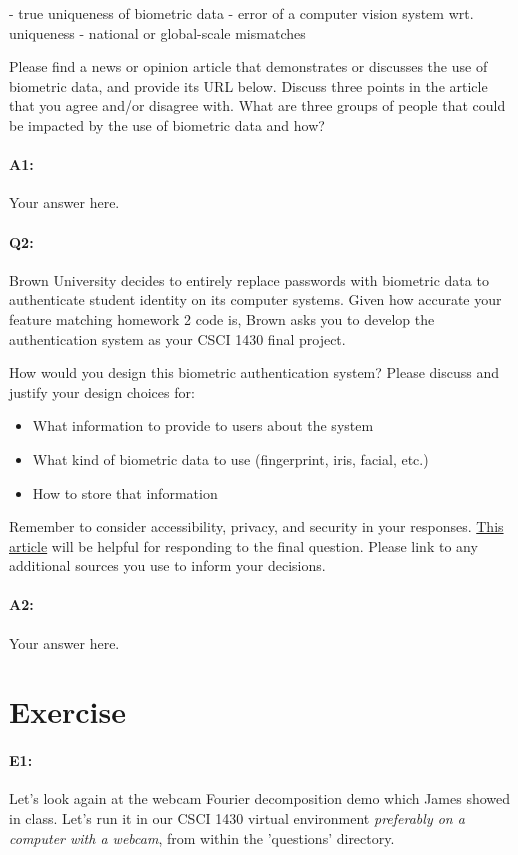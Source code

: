 - true uniqueness of biometric data
- error of a computer vision system wrt. uniqueness
- national or global-scale mismatches

Please find a news or opinion article that demonstrates or discusses the use of biometric data, and provide its URL below. 
Discuss three points in the article that you agree and/or disagree with. 
What are three groups of people that could be impacted by the use of biometric data and how? 

\paragraph{A1:} Your answer here.
\pagebreak


\paragraph{Q2:} Brown University decides to entirely replace passwords with biometric data to authenticate student identity on its computer systems. Given how accurate your feature matching homework 2 code is, Brown asks you to develop the authentication system as your CSCI 1430 final project.

How would you design this biometric authentication system?
Please discuss and justify your design choices for: 
\begin{itemize}
	\item What information to provide to users about the system
	\item What kind of biometric data to use (fingerprint, iris, facial, etc.)
	\item How to store that information
\end{itemize}
Remember to consider accessibility, privacy, and security in your responses. \href{https://ievoreader.com/how-biometric-data-is-stored/}{This article} will be helpful for responding to the final question. Please link to any additional sources you use to inform your decisions.

\paragraph{A2:} Your answer here.
\pagebreak


\section*{Exercise}

\paragraph{E1:} Let's look again at the webcam Fourier decomposition demo which James showed in class. Let's run it in our CSCI 1430 virtual environment \emph{preferably on a computer with a webcam}, from within the 'questions' directory.

